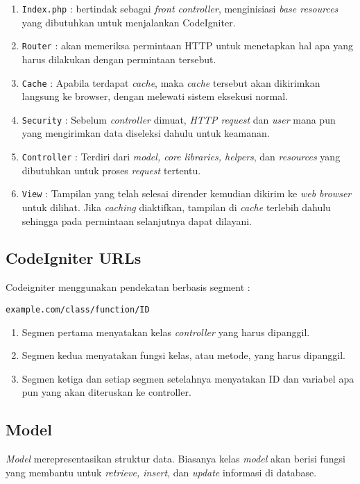 \begin{enumerate}
\item \texttt{Index.php} : bertindak sebagai \textit{front controller}, menginisiasi \textit{base resources} yang dibutuhkan untuk menjalankan CodeIgniter.
\item \texttt{Router} : akan memeriksa permintaan HTTP untuk menetapkan hal apa yang harus dilakukan dengan permintaan tersebut.
\item \texttt{Cache} : Apabila terdapat \textit{cache}, maka \textit{cache} tersebut akan dikirimkan langsung ke browser, dengan melewati sistem eksekusi normal.
\item \texttt{Security} : Sebelum \textit{controller} dimuat, \textit{HTTP request} dan \textit{user} mana pun yang mengirimkan data diseleksi dahulu untuk keamanan.
\item \texttt{Controller} : Terdiri dari \textit{model, core libraries, helpers}, dan \textit{resources} yang dibutuhkan untuk proses \textit{request} tertentu.
\item \texttt{View} : Tampilan yang telah selesai dirender kemudian dikirim ke \textit{web browser} untuk dilihat. Jika \textit{caching} diaktifkan, tampilan di \textit{cache} terlebih dahulu sehingga pada permintaan selanjutnya dapat dilayani.\cite{codeigniter}
\end{enumerate}

\subsection{CodeIgniter URLs}
\label{subs:urls}
Codeigniter menggunakan pendekatan berbasis segment :
\begin{lstlisting}[frame=single] 
example.com/class/function/ID
\end{lstlisting}

\begin{enumerate}
\item Segmen pertama menyatakan kelas \textit{controller} yang harus dipanggil.
\item Segmen kedua menyatakan fungsi kelas, atau metode, yang harus dipanggil.
\item Segmen ketiga dan setiap segmen setelahnya menyatakan ID dan variabel apa pun yang akan diteruskan ke controller.
\end{enumerate}

\subsection{Model}
\label{subs:model}
\textit{Model} merepresentasikan struktur data. Biasanya kelas \textit {model} akan berisi fungsi yang membantu untuk \textit{retrieve, insert}, dan \textit{update} informasi di database.

